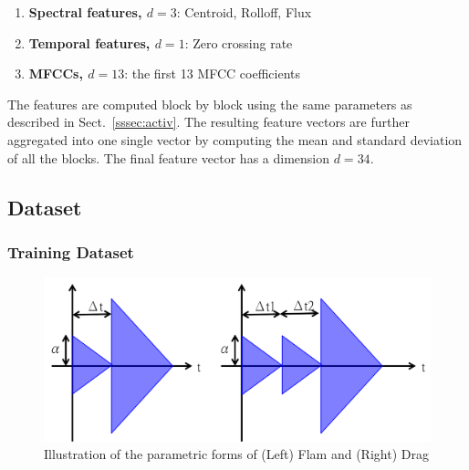 \documentclass{article}
\begin{document}
\begin{enumerate}
	\item \textbf{Spectral features, $d = 3$}: Centroid, Rolloff, Flux
	\item \textbf{Temporal features, $d = 1$}: Zero crossing rate
	\item \textbf{MFCCs, $d = 13$}: the first 13 MFCC coefficients
\end{enumerate}

The features are computed block by block using the same parameters as described in Sect.~\ref{sssec:activ}. The resulting feature vectors are further aggregated into one single vector by computing the mean and standard deviation of all the blocks. The final feature vector has a dimension $d = 34$. 

%

\subsection{Dataset}
\subsubsection{Training Dataset}
\label{sssec:trainData}

\begin{figure} 
\centering
\includegraphics[width = 6.0 cm]{./figures/signal_model.png}
\caption{Illustration of the parametric forms of (Left) Flam and (Right) Drag}
\label{sigModel}
\end{figure}
\end{document}
